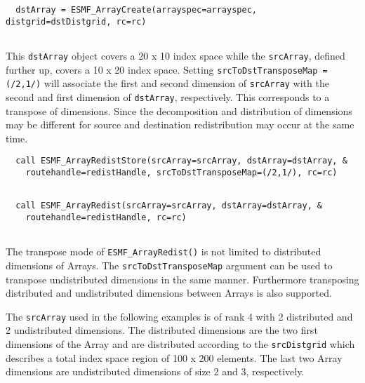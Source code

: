 
 \begin{verbatim}
  dstArray = ESMF_ArrayCreate(arrayspec=arrayspec, distgrid=dstDistgrid, rc=rc)
 
\end{verbatim}
 

   This {\tt dstArray} object covers a 20 x 10 index space while the
   {\tt srcArray}, defined further up, covers a 10 x 20 index space. Setting
   {\tt srcToDstTransposeMap = (/2,1/)} will associate the first and second 
   dimension of {\tt srcArray} with the second and first dimension of
   {\tt dstArray}, respectively. This corresponds to a transpose of dimensions.
   Since the decomposition and distribution of dimensions may be different for
   source and destination redistribution may occur at the same time. 

 \begin{verbatim}
  call ESMF_ArrayRedistStore(srcArray=srcArray, dstArray=dstArray, &
    routehandle=redistHandle, srcToDstTransposeMap=(/2,1/), rc=rc)
 
\end{verbatim}
 

 \begin{verbatim}
  call ESMF_ArrayRedist(srcArray=srcArray, dstArray=dstArray, &
    routehandle=redistHandle, rc=rc)
 
\end{verbatim}
 

   \begin{sloppypar}
   The transpose mode of {\tt ESMF\_ArrayRedist()} is not limited to
   distributed dimensions of Arrays. The {\tt srcToDstTransposeMap} argument
   can be used to transpose undistributed dimensions in the same manner.
   Furthermore transposing distributed and undistributed dimensions between
   Arrays is also supported.
   \end{sloppypar}
  
   The {\tt srcArray} used in the following examples is of rank 4 with 2 
   distributed and 2 undistributed dimensions. The distributed dimensions
   are the two first dimensions of the Array and are distributed according to the
   {\tt srcDistgrid} which describes a total index space region of 100 x 200
   elements. The last two Array dimensions are undistributed dimensions of size
   2 and 3, respectively. 


